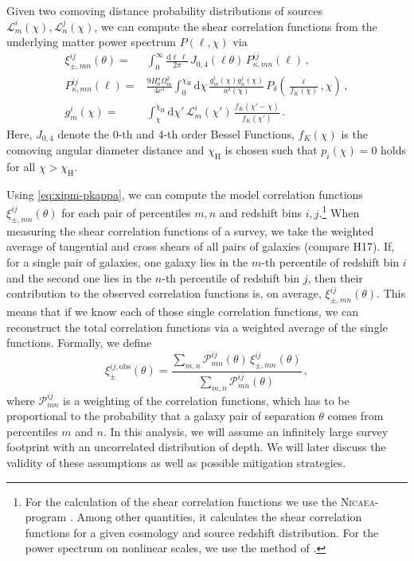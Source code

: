\documentclass[referee]{aa} %
\renewcommand{\[}{\begin{equation}}
\renewcommand{\]}{\end{equation}}
\renewcommand{\rm}{\mathrm}
\begin{document}
Given two comoving distance probability distributions of sources $\mathcal{L}^i_m(\chi),\mathcal{L}^j_n(\chi)$, we can compute the shear correlation functions from the underlying matter power spectrum $P(\ell,\chi)$ via \citep[compare][]{1992ApJ...388..272K} \begin{align}
\label{eq:xipm-pkappa}
\xi_{\pm,mn}^{ij}(\theta) =& \int_0^\infty \frac{{\rm d}\ell\,\ell}{2\pi}\, J_{0,4}(\ell\theta)\, P^{ij}_{\kappa,mn}(\ell)\, , \\
\label{eq:pkappa-pdelta/lenseff}
P^{ij}_{\kappa,mn}(\ell) =& \frac{9 H_0^4\Omega_{\rm m}^2}{4c^4}\int_0^{\chi_{\rm{H}}} {\rm d}\chi\, \frac{g^i_m(\chi)g^j_n(\chi)}{a^2(\chi)}\, P_\delta\left(\frac{\ell}{f_K(\chi)},\chi\right)\, , \\
\label{eq:lenseff}
g^i_m(\chi) =& \int_\chi^{\chi_{\rm{H}}} {\rm d}\chi' \, \mathcal{L}^i_m(\chi') \, \frac{f_K(\chi'-\chi)}{f_K(\chi')}\, .
\end{align}
Here, $J_{0,4}$ denote the 0-th and 4-th order Bessel Functions, $f_K(\chi)$ is the comoving angular diameter distance and $\chi_{\rm{H}}$ is chosen such that $p_i(\chi)=0$ holds for all $\chi>\chi_{\rm{H}}$.

Using \eqref{eq:xipm-pkappa}, we can compute the model correlation functions $\xi_{\pm,mn}^{ij}(\theta)$ for each pair of percentiles $m,n$ and redshift bins $i,j$.\footnote{For the calculation of the shear correlation functions we use the \textsc{Nicaea}-program \citep{10.1093/mnras/stx2082}. Among other quantities, it calculates the shear correlation functions for a given cosmology and source redshift distribution. For the power spectrum on nonlinear scales, we use the method of \citet{2012ApJ...761..152T}.} When measuring the shear correlation functions of a survey, we take the weighted average of tangential and cross shears of all pairs of galaxies (compare H17). If, for a single pair of galaxies, one galaxy lies in the $m$-th percentile of redshift bin $i$ and the second one lies in the $n$-th percentile of redshift bin $j$, then their contribution to the observed correlation functions is, on average, $\xi_{\pm,mn}^{ij}(\theta)$. This means that if we know each of those single correlation functions, we can reconstruct the total correlation functions via a weighted average of the single functions. Formally, we define \[
\xi_\pm^{ij,\rm{obs}}(\theta) = \frac{\sum_{m,n} \mathcal{P}_{mn}^{ij}(\theta)\,\xi_{\pm,mn}^{ij}(\theta)}{\sum_{m,n} \mathcal{P}_{mn}^{ij}(\theta)}\, ,
\label{eq:def_xiobs}
\]
where $\mathcal{P}_{mn}^{ij}$ is a weighting of the correlation functions, which has to be proportional to the probability that a galaxy pair of separation $\theta$ comes from percentiles $m$ and $n$. In this analysis, we will assume an infinitely large survey footprint with an uncorrelated distribution of depth. We will later discuss the validity of these assumptions as well as possible mitigation strategies. 
\end{document}
